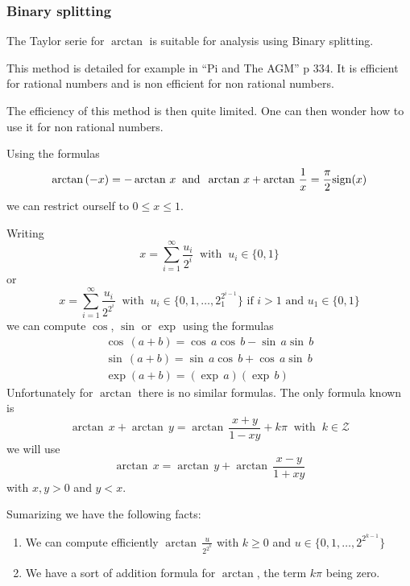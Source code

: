 \documentclass[12pt]{amsart}
\def\Z{{\mathcal Z}}
\begin{document}
\subsubsection{Binary splitting}
\noindent The Taylor serie for $\arctan$ is suitable for analysis using Binary splitting.
\par This method is detailed for example in ``Pi and The AGM'' p 334. It is efficient for rational numbers and is non efficient for non rational numbers.
\par The efficiency of this method is then quite limited. One can then wonder how to use it for non rational numbers.
\par Using the formulas
\begin{equation*}
\arctan\,(-x)=-\arctan\,x\;\;\mbox{and}\;\;\arctan\,x+\arctan\,\frac{1}{x}=\frac{\pi}{2}{\rm sign}(x)
\end{equation*}
we can restrict ourself to $0\leq x\leq 1$.
\par Writing 
\begin{equation*}
x=\sum_{i=1}^{\infty} \frac{u_i}{2^i}\;\;\mbox{with}\;\;u_i\in\{0,1\}
\end{equation*}
or
\begin{equation*}
x=\sum_{i=1}^{\infty} \frac{u_i}{2^{2^i}}\;\;\mbox{with}\;\;u_i\in\{0,1,\dots,2^{2^{i-1}}_1\}\mbox{~if~}i>1\mbox{~and~}u_1\in \{0,1\}
\end{equation*}
we can compute $\cos$,  $\sin$ or $\exp$ using the formulas
\begin{equation*}
\begin{array}{c}
\cos\,(a+b)=\cos\,a\cos\,b-\sin\,a\sin\,b\\
\sin\,(a+b)=\sin\,a\cos\,b+\cos\,a\sin\,b\\
\exp(a+b)=(\exp\,a)(\exp\,b)
\end{array}
\end{equation*}
Unfortunately for $\arctan$ there is no similar formulas. The only formula known is
\begin{equation*}
\arctan\,x+\arctan\,y=\arctan\,\frac{x+y}{1-xy}+k\pi\;\;\mbox{with}\;\;k\in\Z
\end{equation*}
we will use 
\begin{equation*}
\arctan\,x=\arctan\,y+\arctan\,\frac{x-y}{1+xy}
\end{equation*}
with $x,y>0$ and $y<x$.
\par Sumarizing we have the following facts:
\begin{enumerate}
\item We can compute efficiently $\arctan\,\frac{u}{2^{2^k}}$ with $k\geq 0$ and $u\in\{0,1,\dots,2^{2^{k-1}}\}$
\item We have a sort of addition formula for $\arctan$, the term $k\pi$ being zero.
\end{enumerate}
\end{document}
